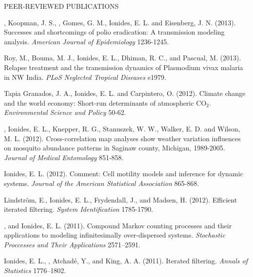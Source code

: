 \begin{reflist}{PEER-REVIEWED PUBLICATIONS}
\item\formal{[[\mayerAJE] ] }
, Koopman, J. S., , Gomes, G. M., Ionides, E. L. and Eisenberg, J. N. (2013). Successes and shortcomings of polio eradication:  A transmission modeling analysis. {\em American Journal of Epidemiology} {}{\separator}1236-1245. 

\item\formal{[[\royPLOSNTD] ] }
Roy, M., Bouma, M. J., Ionides, E. L., Dhiman, R. C., and Pascual, M. 
(2013). Relapse treatment and the transmission dynamics of Plasmodium vivax malaria in NW India. {\em PLoS Neglected Tropical Diseases} {}{\separator}e1979.

\item\formal{[[\tapiaESP] ] }
Tapia Granados, J. A., Ionides, E. L.  and Carpintero, O. (2012). Climate change and the world economy: Short-run determinants of atmospheric $\mathrm{CO}_2$. {\em Environmental Science and Policy} {}{\separator}50-62.

\item\formal{[[\chuangJME] ] }
, Ionides, E. L., Knepper, R. G., Stanuszek, W. W., Walker, E. D. and Wilson, M. L. (2012).
Cross-correlation map analyses show weather variation influences on mosquito abundance patterns in Saginaw county, Michigan, 1989-2005. {\em Journal of Medical Entomology} {}{\separator}851-858.

\item\formal{[[\ionidesJASA] ]}
Ionides, E. L. (2012). Comment: Cell motility models and inference for dynamic systems. {\em Journal of the American Statistical Association} {}{\separator}865-868.

\item\formal{[[\lindstromIFAC] ]} 
Lindstr\"{o}m, E., Ionides, E. L., Frydendall, J., and Madsen, H. (2012). Efficient iterated filtering. 
{\em System Identification} {}{\separator}1785-1790.

\item\formal{[[\bretoSPA] ]}
 , and Ionides, E. L. (2011). Compound Markov counting processes and their applications to modeling infinitesimally over-dispersed systems. {\em Stochastic Proccesses and Their Applications} {}{\separator}2571--2591.

\item\formal{[[\ionidesAOS] ]}
 Ionides, E. L., , Atchad\'{e}, Y., and King, A. A. (2011). Iterated filtering. {\em Annals of Statistics} {}{\separator}1776--1802.


\end{reflist}
